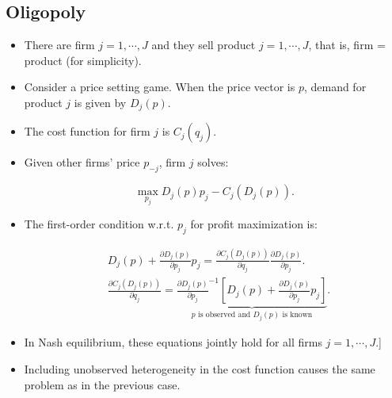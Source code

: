 \documentclass[]{book}
\theoremstyle{definition}
\theoremstyle{definition}
\theoremstyle{definition}
\theoremstyle{remark}
\begin{document}
\subsection{Oligopoly}\label{oligopoly}

\begin{itemize}
\item
  There are firm \(j = 1, \cdots, J\) and they sell product
  \(j = 1, \cdots, J\), that is, firm = product (for simplicity).
\item
  Consider a price setting game. When the price vector is \(p\), demand
  for product \(j\) is given by \(D_j(p)\).
\item
  The cost function for firm \(j\) is \(C_j(q_j)\).
\item
  Given other firms' price \(p_{-j}\), firm \(j\) solves:

  \begin{equation}
  \max_{p_j} D_j(p) p_j - C_j(D_j(p)).
  \end{equation}
\item
  The first-order condition w.r.t. \(p_j\) for profit maximization is:

  \begin{equation}
  \begin{split}
  &D_j(p) + \frac{\partial D_j(p)}{\partial p_j} p_j = \frac{\partial C_j(D_j(p))}{\partial q_j} \frac{\partial D_j(p)}{\partial p_j}.\\
  &\frac{\partial C_j(D_j(p))}{\partial q_j} = \underbrace{\frac{\partial D_j(p)}{\partial p_j}^{-1}[D_j(p) + \frac{\partial D_j(p)}{\partial p_j} p_j ]}_{\text{$p$ is observed and $D_j(p)$ is known}}.
  \end{split}
  \end{equation}
\item
  In Nash equilibrium, these equations jointly hold for all firms
  \(j = 1, \cdots, J\).{]}
\item
  Including unobserved heterogeneity in the cost function causes the
  same problem as in the previous case.
\end{itemize}


\end{document}
